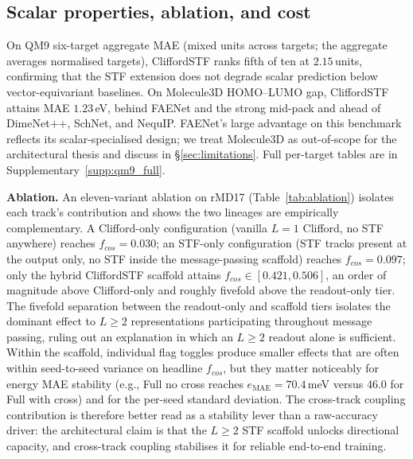 \subsection{Scalar properties, ablation, and cost}\label{sec:results_scalar}

On QM9 six-target aggregate MAE (mixed units across targets; the aggregate averages normalised targets), CliffordSTF ranks fifth of ten at $2.15$\,units, confirming that the STF extension does not degrade scalar prediction below vector-equivariant baselines. On Molecule3D HOMO--LUMO gap, CliffordSTF attains MAE $1.23$\,eV, behind FAENet and the strong mid-pack and ahead of DimeNet++, SchNet, and NequIP. FAENet's large advantage on this benchmark reflects its scalar-specialised design; we treat Molecule3D as out-of-scope for the architectural thesis and discuss in \S\ref{sec:limitations}. Full per-target tables are in Supplementary~\ref{supp:qm9_full}.

\textbf{Ablation.} An eleven-variant ablation on rMD17 (Table~\ref{tab:ablation}) isolates each track's contribution and shows the two lineages are empirically complementary. A Clifford-only configuration (vanilla $L{=}1$ Clifford, no STF anywhere) reaches $f_{cos}{=}0.030$; an STF-only configuration (STF tracks present at the output only, no STF inside the message-passing scaffold) reaches $f_{cos}{=}0.097$; only the hybrid CliffordSTF scaffold attains $f_{cos}{\in}[0.421, 0.506]$, an order of magnitude above Clifford-only and roughly fivefold above the readout-only tier. The fivefold separation between the readout-only and scaffold tiers isolates the dominant effect to $L\!\geq\!2$ representations participating throughout message passing, ruling out an explanation in which an $L\!\geq\!2$ readout alone is sufficient. Within the scaffold, individual flag toggles produce smaller effects that are often within seed-to-seed variance on headline $f_{cos}$, but they matter noticeably for energy MAE stability (e.g., Full no cross reaches $e_{\text{MAE}}{=}70.4$\,meV versus $46.0$ for Full with cross) and for the per-seed standard deviation. The cross-track coupling contribution is therefore better read as a stability lever than a raw-accuracy driver: the architectural claim is that the $L\!\geq\!2$ STF scaffold unlocks directional capacity, and cross-track coupling stabilises it for reliable end-to-end training.

